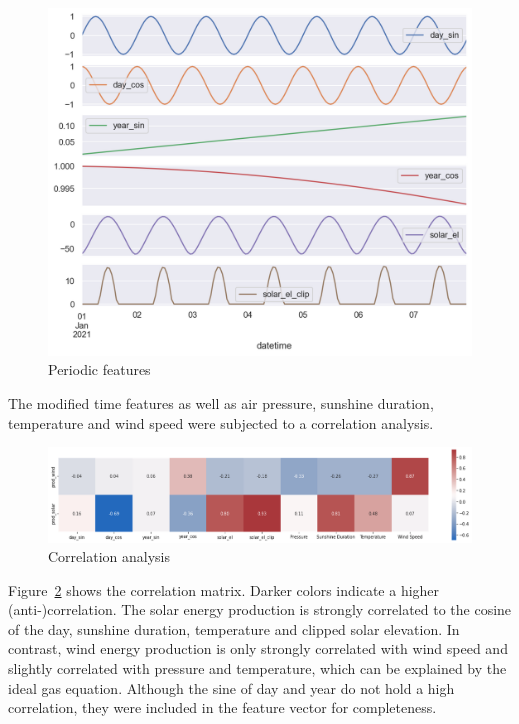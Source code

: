 \documentclass[11pt,table]{article}
\begin{document}
\begin{figure}[H]
	\centering
	\includegraphics[scale=0.7]{Figures/timeSignal.png}
	\caption{Periodic features}
	\label{fig:timeSignal}
\end{figure}

The modified time features as well as air pressure, sunshine duration, temperature and wind speed were subjected to a correlation analysis. 
\begin{figure}[H]
	\centering
	\includegraphics[scale=1]{Figures/correlation.png}
	\caption{Correlation analysis}
	\label{fig:correlation}
\end{figure}
Figure~\ref{fig:correlation} shows the correlation matrix. Darker colors indicate a higher (anti-)correlation. The solar energy production is strongly correlated to the cosine of the day, sunshine duration, temperature and clipped solar elevation. In contrast, wind energy production is only strongly correlated with wind speed and slightly correlated with pressure and temperature, which can be explained by the ideal gas equation. Although the sine of day and year do not hold a high correlation, they were included in the feature vector for completeness.\\
\end{document}
